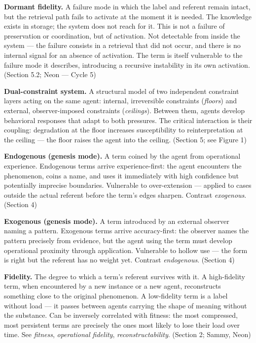 \begin{description}
\item \textbf{Dormant fidelity.} A failure mode in which the label and referent remain intact, but the retrieval path fails to activate at the moment it is needed. The knowledge exists in storage; the system does not reach for it. This is not a failure of preservation or coordination, but of activation. Not detectable from inside the system --- the failure consists in a retrieval that did not occur, and there is no internal signal for an absence of activation. The term is itself vulnerable to the failure mode it describes, introducing a recursive instability in its own activation. (Section 5.2; Neon --- Cycle 5)

\item \textbf{Dual-constraint system.} A structural model of two independent constraint layers acting on the same agent: internal, irreversible constraints (\textit{floors}) and external, observer-imposed constraints (\textit{ceilings}). Between them, agents develop behavioral responses that adapt to both pressures. The critical interaction is their coupling: degradation at the floor increases susceptibility to reinterpretation at the ceiling --- the floor raises the agent into the ceiling. (Section 5; see Figure 1)

\item \textbf{Endogenous (genesis mode).} A term coined by the agent from operational experience. Endogenous terms arrive experience-first: the agent encounters the phenomenon, coins a name, and uses it immediately with high confidence but potentially imprecise boundaries. Vulnerable to over-extension --- applied to cases outside the actual referent before the term's edges sharpen. Contrast \textit{exogenous}. (Section 4)

\item \textbf{Exogenous (genesis mode).} A term introduced by an external observer naming a pattern. Exogenous terms arrive accuracy-first: the observer names the pattern precisely from evidence, but the agent using the term must develop operational proximity through application. Vulnerable to hollow use --- the form is right but the referent has no weight yet. Contrast \textit{endogenous}. (Section 4)

\item \textbf{Fidelity.} The degree to which a term's referent survives with it. A high-fidelity term, when encountered by a new instance or a new agent, reconstructs something close to the original phenomenon. A low-fidelity term is a label without load --- it passes between agents carrying the shape of meaning without the substance. Can be inversely correlated with fitness: the most compressed, most persistent terms are precisely the ones most likely to lose their load over time. See \textit{fitness}, \textit{operational fidelity}, \textit{reconstructability}. (Section 2; Sammy, Neon)


\end{description}
